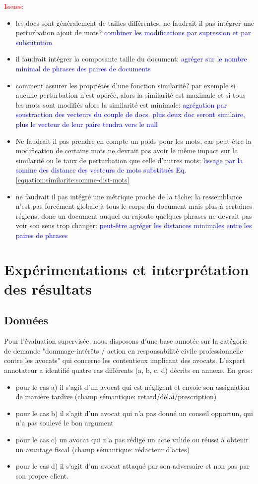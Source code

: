 \textcolor{red}{Issues:}
\begin{itemize}
\item les docs sont généralement de tailles différentes, ne faudrait il pas intégrer une perturbation ajout de mots? \textcolor{blue}{combiner les modifications par supression et par substitution}
\item il faudrait intégrer la composante taille du document: \textcolor{blue}{agréger sur le nombre minimal de phrases des paires de documents}
\item comment assurer les propriétés d'une fonction similarité? par exemple si aucune perturbation n'est opérée, alors la similarité est maximale et si tous les mots sont modifiés alors la similarité est minimale: \textcolor{blue}{agrégation par soustraction des vecteurs du couple de docs. plus deux doc seront similaire, plus le vecteur de leur paire tendra vers le null}
\item Ne faudrait il pas prendre en compte un poids pour les mots, car peut-être la modification de certains mots ne devrait pas avoir le même impact sur la similarité ou le taux de perturbation que celle d'autres mots:  \textcolor{blue}{lissage par la somme des distance des vecteurs de mots substitués Eq. \ref{equation:similarite:somme-dist-mots}}
\item ne faudrait il pas intégré une métrique proche de la tâche: la ressemblance n'est pas forcément globale à tous le corps du document mais plus à certaines régions; donc un document auquel on rajoute quelques phrases ne devrait pas voir  son sens trop changer:  \textcolor{blue}{peut-être agréger les distances minimales entre les paires de phrases}
\end{itemize}

\section{Expérimentations et interprétation des résultats}
\label{sec:similarite:experimentations}
\subsection{Données}
Pour l'évaluation supervisée, nous disposons d'une base annotée sur la catégorie de demande "dommage-intérêts / action en responsabilité civile professionnelle contre les avocats" qui concerne les contentieux implicant des avocats.
L'expert annotateur a identifié quatre cas différents (a, b, c, d) décrits en annexe. En gros:
\begin{itemize}
\item pour le cas a) il s'agit d'un avocat qui est négligent et envoie son assignation de manière tardive (champ sémantique: retard/délai/prescription)
\item pour le cas b) il s'agit d'un avocat qui n'a pas donné un conseil opportun, qui n'a pas soulevé le bon argument
\item pour le cas c) un avocat qui n'a pas rédigé un acte valide ou réussi à obtenir un avantage fiscal (champ sémantique: rédacteur d'actes)
\item pour le cas d) il s'agit d'un avocat attaqué par son adversaire et non pas par son propre client.
\end{itemize}

